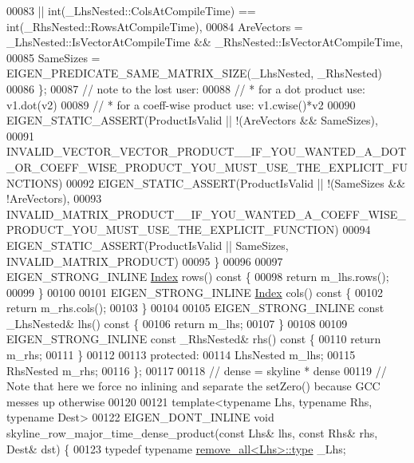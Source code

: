 \begin{DoxyCode}
00083             || int(\_LhsNested::ColsAtCompileTime) == int(\_RhsNested::RowsAtCompileTime),
00084             AreVectors = \_LhsNested::IsVectorAtCompileTime && \_RhsNested::IsVectorAtCompileTime,
00085             SameSizes = EIGEN\_PREDICATE\_SAME\_MATRIX\_SIZE(\_LhsNested, \_RhsNested)
00086         \};
00087         \textcolor{comment}{// note to the lost user:}
00088         \textcolor{comment}{//    * for a dot product use: v1.dot(v2)}
00089         \textcolor{comment}{//    * for a coeff-wise product use: v1.cwise()*v2}
00090         EIGEN\_STATIC\_ASSERT(ProductIsValid || !(AreVectors && SameSizes),
00091                 
      INVALID\_VECTOR\_VECTOR\_PRODUCT\_\_IF\_YOU\_WANTED\_A\_DOT\_OR\_COEFF\_WISE\_PRODUCT\_YOU\_MUST\_USE\_THE\_EXPLICIT\_FUNCTIONS)
00092                 EIGEN\_STATIC\_ASSERT(ProductIsValid || !(SameSizes && !AreVectors),
00093                 
      INVALID\_MATRIX\_PRODUCT\_\_IF\_YOU\_WANTED\_A\_COEFF\_WISE\_PRODUCT\_YOU\_MUST\_USE\_THE\_EXPLICIT\_FUNCTION)
00094                 EIGEN\_STATIC\_ASSERT(ProductIsValid || SameSizes, INVALID\_MATRIX\_PRODUCT)
00095     \}
00096 
00097     EIGEN\_STRONG\_INLINE \hyperlink{namespace_eigen_a62e77e0933482dafde8fe197d9a2cfde}{Index} rows()\textcolor{keyword}{ const }\{
00098         \textcolor{keywordflow}{return} m\_lhs.rows();
00099     \}
00100 
00101     EIGEN\_STRONG\_INLINE \hyperlink{namespace_eigen_a62e77e0933482dafde8fe197d9a2cfde}{Index} cols()\textcolor{keyword}{ const }\{
00102         \textcolor{keywordflow}{return} m\_rhs.cols();
00103     \}
00104 
00105     EIGEN\_STRONG\_INLINE \textcolor{keyword}{const} \_LhsNested& lhs()\textcolor{keyword}{ const }\{
00106         \textcolor{keywordflow}{return} m\_lhs;
00107     \}
00108 
00109     EIGEN\_STRONG\_INLINE \textcolor{keyword}{const} \_RhsNested& rhs()\textcolor{keyword}{ const }\{
00110         \textcolor{keywordflow}{return} m\_rhs;
00111     \}
00112 
00113 \textcolor{keyword}{protected}:
00114     LhsNested m\_lhs;
00115     RhsNested m\_rhs;
00116 \};
00117 
00118 \textcolor{comment}{// dense = skyline * dense}
00119 \textcolor{comment}{// Note that here we force no inlining and separate the setZero() because GCC messes up otherwise}
00120 
00121 \textcolor{keyword}{template}<\textcolor{keyword}{typename} Lhs, \textcolor{keyword}{typename} Rhs, \textcolor{keyword}{typename} Dest>
00122 EIGEN\_DONT\_INLINE \textcolor{keywordtype}{void} skyline\_row\_major\_time\_dense\_product(\textcolor{keyword}{const} Lhs& lhs, \textcolor{keyword}{const} Rhs& rhs, Dest& dst) \{
00123     \textcolor{keyword}{typedef} \textcolor{keyword}{typename} \hyperlink{group___sparse_core___module}{remove\_all<Lhs>::type} \_Lhs;

\end{DoxyCode}
